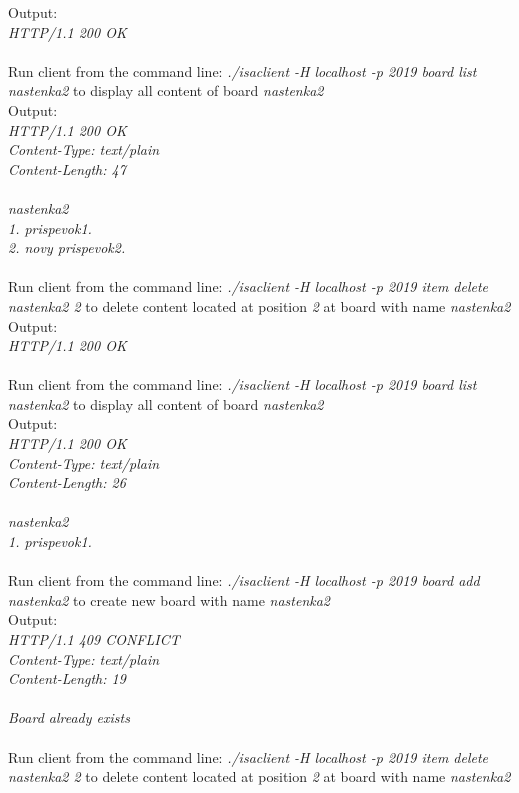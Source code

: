 \documentclass[11pt, a4paper]{article}
\begin{document}
	Output: \\
	\textit{HTTP/1.1 200 OK \\}
	\\Run client from the command line: \textit{./isaclient -H localhost -p 2019 board list nastenka2} to display all content of board \textit{nastenka2} \\
	Output: \\
	\textit{HTTP/1.1 200 OK \\ Content-Type: text/plain \\ Content-Length: 47 \\ \\ nastenka2 \\ 1. prispevok1. \\ 2. novy prispevok2. \\}
	\\Run client from the command line: \textit{./isaclient -H localhost -p 2019 item delete nastenka2 2} to delete content located at position \textit{2} at board with name \textit{nastenka2} \\
	Output: \\
	\textit{HTTP/1.1 200 OK \\}
	\\Run client from the command line: \textit{./isaclient -H localhost -p 2019 board list nastenka2} to display all content of board \textit{nastenka2} \\
	Output: \\
	\textit{HTTP/1.1 200 OK \\ Content-Type: text/plain \\ Content-Length: 26 \\ \\ nastenka2 \\ 1. prispevok1. \\}
	\\Run client from the command line: \textit{./isaclient -H localhost -p 2019 board add nastenka2} to create new board with name \textit{nastenka2} \\
	Output: \\
	\textit{HTTP/1.1 409 CONFLICT \\ Content-Type: text/plain \\ Content-Length: 19 \\ \\ Board already exists \\}
	\\Run client from the command line: \textit{./isaclient -H localhost -p 2019 item delete nastenka2 2} to delete content located at position \textit{2} at board with name \textit{nastenka2} \\
\end{document}
